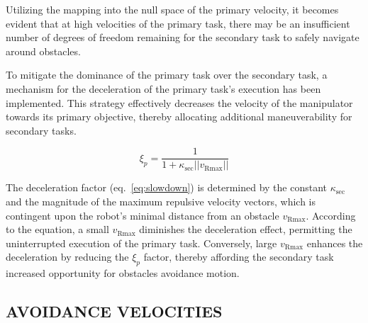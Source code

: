 \documentclass[letterpaper, 10 pt, conference]{ieeeconf}  %
\begin{document}
Utilizing the mapping into the null space of the primary velocity, it becomes evident that at high velocities of the primary task, there may be an insufficient number of degrees of freedom remaining for the secondary task to safely navigate around obstacles. 


\label{chap:primary slowdown}

To mitigate the dominance of the primary task over the secondary task, a mechanism for the deceleration of the primary task's execution has been implemented. This strategy effectively decreases the velocity of the manipulator towards its primary objective, thereby allocating additional maneuverability for secondary tasks.

\begin{equation}
	\label{eq:slowdown}
	\xi_{p}=
	\frac{1}{1 + \kappa_{\text{sec}} ||v_{\text{Rmax}}||}
\end{equation}

The deceleration factor (eq.~\ref{eq:slowdown}) is determined by the constant \( \kappa_{\text{sec}} \) and the magnitude of the maximum repulsive velocity vectors, which is contingent upon the robot's minimal distance from an obstacle \( v_{\text{Rmax}} \). According to the equation, a small \( v_{\text{Rmax}} \) diminishes the deceleration effect, permitting the uninterrupted execution of the primary task. Conversely, large \( v_{\text{Rmax}} \) enhances the deceleration by reducing the $\xi_{p}$ factor, thereby affording the secondary task increased opportunity for obstacles avoidance motion.


\subsection{AVOIDANCE VELOCITIES}
\end{document}

